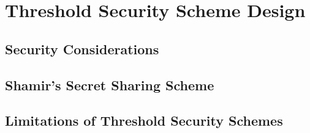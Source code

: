 \chapter{Threshold Security Scheme Design}

\section{Security Considerations}

\section{Shamir's Secret Sharing Scheme}

\section{Limitations of Threshold Security Schemes}